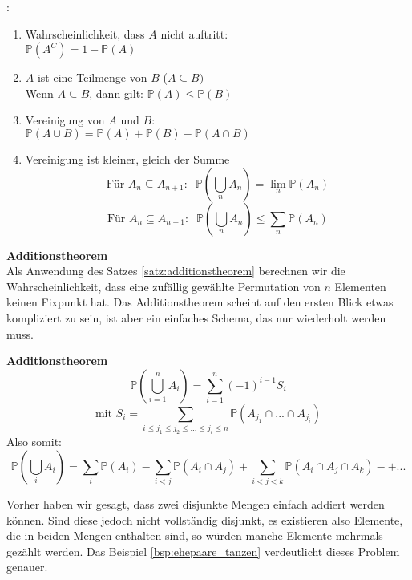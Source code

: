 {    \begin{definition}:\\
        \begin{enumerate}
            \item Wahrscheinlichkeit, dass $A$ nicht auftritt:\\
                $\mathbb{P}\left(A^{C}\right)=1-\mathbb{P}(A)$
            \item $A$ ist eine Teilmenge von $B$ ($A\subseteq B)$\\
                Wenn $A\subseteq B$, dann gilt: $\mathbb{P}(A)\le \mathbb{P}(B)$
            \item Vereinigung von $A$ und $B$:\\
                $\mathbb{P}(A\cup B)=\mathbb{P}(A)+\mathbb{P}(B)-\mathbb{P}(A\cap B)$
            \item Vereinigung ist kleiner, gleich der Summe
                \[\text{Für }A_n\subseteq A_{n+1}:\;\;\mathbb{P}\left(\bigcup_nA_n\right)=\lim_n\mathbb{P}(A_n)\]
                \[\text{Für }A_n\subseteq A_{n+1}:\;\;\mathbb{P}\left(\bigcup_nA_n\right)\leq\sum_n\mathbb{P}(A_n)\]
        \end{enumerate}
    \end{definition}

    \textbf{Additionstheorem}\\
    Als Anwendung des Satzes \ref{satz:additionstheorem} berechnen wir die Wahrscheinlichkeit, dass
    eine zufällig gewählte Permutation von $n$ Elementen keinen Fixpunkt hat.
    Das Additionstheorem scheint auf den ersten Blick etwas kompliziert zu
    sein, ist aber ein einfaches Schema, das nur wiederholt werden muss.

    \begin{satz} \textbf{Additionstheorem}
    \label{satz:additionstheorem}
    \[\mathbb{P}\left(\bigcup_{i=1}^nA_i\right)=\sum_{i=1}^n(-1)^{i-1}S_i\]
    \[\text{mit } S_i=\sum_{i\leq j_1\leq j_2\leq ...\leq j_i\leq n} \mathbb{P}(A_{j_1}\cap...\cap A_{j_i})\]
    Also somit:
    \[\mathbb{P}(\bigcup_i A_i)=\sum_i\mathbb{P}(A_i)-\sum_{i<j}\mathbb{P}(A_i\cap A_j)+\sum_{i<j<k}\mathbb{P}(A_i\cap A_j\cap A_k)-+...\]
    \end{satz}

    Vorher haben wir gesagt, dass zwei disjunkte Mengen
    einfach addiert werden können. Sind diese jedoch nicht vollständig
    disjunkt, es existieren also Elemente, die in beiden Mengen enthalten
    sind, so würden manche Elemente mehrmals gezählt werden. Das Beispiel \ref{bsp:ehepaare_tanzen} 
    verdeutlicht dieses Problem genauer.

}
